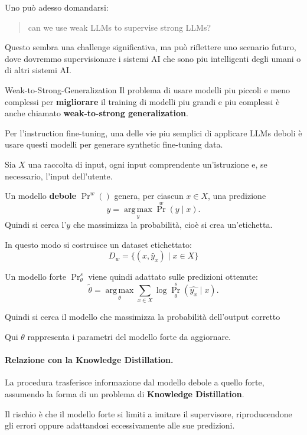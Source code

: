 Uno può adesso domandarsi:
\begin{center}
    \begin{quote}
        can we use weak LLMs to supervise strong LLMs?
    \end{quote}
\end{center}
Questo sembra una challenge significativa, ma può riflettere uno scenario futuro, dove dovremmo supervisionare i sistemi AI che sono piu intelligenti degli umani o di altri sistemi AI.


\begin{definition}{Weak-to-Strong-Generalization}
Il problema di usare modelli piu piccoli e meno complessi per \textbf{migliorare} il training di modelli piu grandi e piu complessi è anche chiamato \textbf{weak-to-strong generalization}.    
\end{definition}


Per l'instruction fine-tuning, una delle vie piu semplici di applicare LLMs deboli è usare questi modelli per generare synthetic fine-tuning data.



Sia $X$ una raccolta di input,
ogni input comprendente un'istruzione
e, se necessario, l'input dell'utente.

Un modello \textbf{debole} $\Pr^{w}()$ genera,
per ciascun $x\in X$, una predizione
\[
\hat{y}
=
\operatorname*{arg\,max}_{y}
\Pr^{w}(y\mid x).
\]
Quindi si cerca l'$y$ che massimizza la probabilità, cioè si crea un'etichetta.

In questo modo si costruisce un dataset etichettato:
\[
D_w=\{(x,\hat y_x)\mid x\in X\}
\]

Un modello forte $\Pr^{s}_{\theta}$
viene quindi adattato sulle predizioni ottenute:
\[
\tilde{\theta}
=
\operatorname*{arg\,max}_{\theta}
\sum_{x\in X}
\log \Pr^{s}_{\theta}(\hat{y_x}\mid x).
\tag{4.10}
\]

Quindi si cerca il modello che massimizza la probabilità dell'output corretto

Qui $\theta$ rappresenta i parametri
del modello forte da aggiornare.

\paragraph{Relazione con la Knowledge Distillation.}
La procedura trasferisce informazione
dal modello debole a quello forte,
assumendo la forma di un problema
di \textbf{Knowledge Distillation}.

Il rischio è che il modello forte
si limiti a imitare il supervisore,
riproducendone gli errori
oppure adattandosi eccessivamente
alle sue predizioni.

